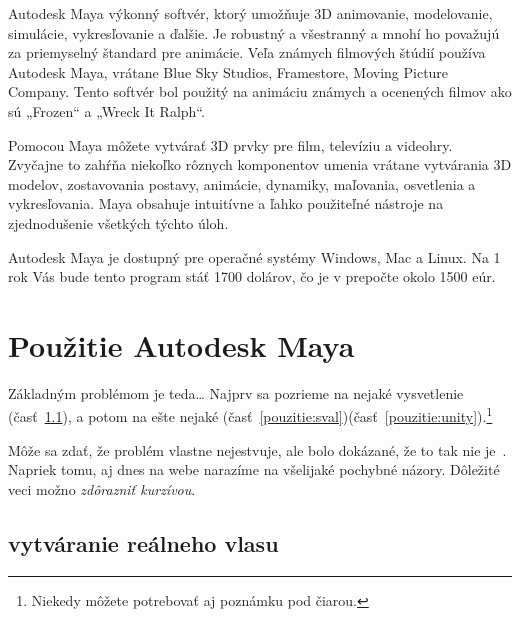 \documentclass[10pt,twoside,slovak,a4paper]{article}
\begin{document}
\begin{figure*}[tbh]
Autodesk Maya výkonný softvér, ktorý umožňuje 3D animovanie, modelovanie, simulácie, vykresľovanie a ďalšie. Je robustný a všestranný a mnohí ho považujú za priemyselný štandard pre animácie. Veľa známych filmových štúdií používa Autodesk Maya, vrátane  Blue Sky Studios, Framestore, Moving Picture Company. Tento softvér bol použitý na animáciu známych a ocenených filmov ako sú „Frozen“ a „Wreck It Ralph“.

Pomocou Maya môžete vytvárať 3D prvky pre film, televíziu a videohry. Zvyčajne to zahŕňa niekoľko rôznych komponentov umenia vrátane vytvárania 3D modelov, zostavovania postavy, animácie, dynamiky, maľovania, osvetlenia a vykresľovania. Maya obsahuje intuitívne a ľahko použiteľné nástroje na zjednodušenie všetkých týchto úloh.

Autodesk Maya je dostupný pre operačné systémy Windows, Mac a Linux. Na 1 rok Vás bude tento program stáť 1700 dolárov, čo je v prepočte okolo 1500 eúr.
\end{figure*}



\section{Použitie Autodesk Maya} \label{pouzitie}

Základným problémom je teda\ldots{} Najprv sa pozrieme na nejaké vysvetlenie (časť~\ref{pouzitie:vlas}), a potom na ešte nejaké (časť~\ref{pouzitie:sval})(časť~\ref{pouzitie:unity}).\footnote{Niekedy môžete potrebovať aj poznámku pod čiarou.}

Môže sa zdať, že problém vlastne nejestvuje\cite{Coplien:MPD}, ale bolo dokázané, že to tak nie je~\cite{Czarnecki:Staged, Czarnecki:Progress}. Napriek tomu, aj dnes na webe narazíme na všelijaké pochybné názory\cite{PLP-Framework}. Dôležité veci možno \emph{zdôrazniť kurzívou}.


\subsection{vytváranie reálneho vlasu} \label{pouzitie:vlas}
\end{document}
